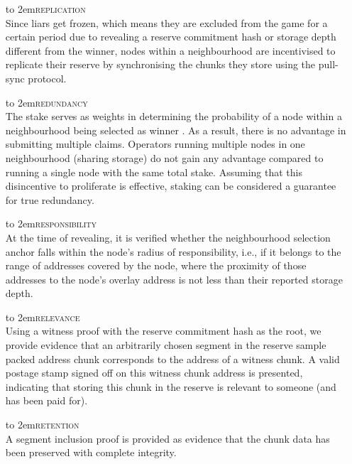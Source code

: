 \begin{itemize}[noitemsep]
%
\item[\hbox to 2em{\textsc{replication}}] \hspace{1cm}\\ Since liars get frozen, which means they are excluded from the game for a certain period due to revealing a reserve commitment hash or storage depth different from the winner, nodes within a neighbourhood are incentivised to replicate their reserve by synchronising the chunks they store using the pull-sync protocol.
%
\item[\hbox to 2em{\textsc{redundancy}}] \hspace{1cm}\\ The stake serves as weights in determining the probability of a node within a neighbourhood being selected as winner%
. As a result, there is no advantage in submitting multiple claims. Operators running multiple nodes in one neighbourhood (sharing storage) do not gain any advantage compared to running a single node with the same total stake. Assuming that this disincentive to proliferate is effective, staking can be considered a guarantee for true redundancy.
%
\item[\hbox to 2em{\textsc{responsibility}}] \hspace{1cm}\\  At the time of revealing, it is verified whether the neighbourhood selection anchor falls within the node's radius of responsibility, i.e., if it belongs to the range of addresses covered by the node, where the proximity of those addresses to the node's overlay address is not less than their reported storage depth. 
%
\item[\hbox to 2em{\textsc{relevance}}] \hspace{1cm}\\ Using a witness proof with the reserve commitment hash as the root, we provide evidence that an arbitrarily chosen segment in the reserve sample packed address chunk corresponds to the address of a witness chunk. 
A valid postage stamp signed off on this witness chunk address is presented, indicating that storing this chunk in the reserve is relevant to someone (and has been paid for). 
\item[\hbox to 2em{\textsc{retention}}] \hspace{1cm}\\ A segment inclusion proof is provided as evidence that the chunk data has been preserved with complete integrity. 

\end{itemize}
